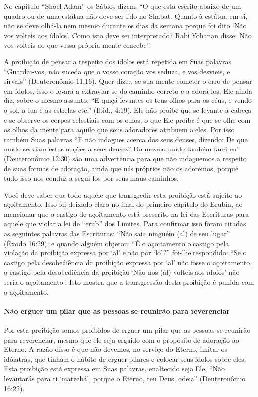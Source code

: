 No capítulo ``Shoel Adam'' os Sábios dizem: ``O que está escrito abaixo
de um quadro ou de uma estátua não deve ser lido no Shabat. Quanto à
estátua em si, não se deve olhá-la nem mesmo durante os dias da semana
porque foi dito `Não vos volteis aos ídolos'. Como isto deve ser
interpretado? Rabi Yohanan disse: Não vos volteis ao que vossa própria
mente concebe''.

A proibição de pensar a respeito dos ídolos está repetida em Suas
palavras ``Guardai-vos, não suceda que o vosso coração vos seduza, e vos
desvieis, e sirvais'' (Deuteronômio 11:16). Quer dizer, se sua mente
cometer o erro de pensar em ídolos, isso o levará a extraviar-se do
caminho correto e a adorá-los. Ele ainda diz, sobre o mesmo assunto, ``E
quiçá levantes os teus olhos para os céus, e vendo o sol, a lua e as
estrelas etc.'' (Ibid., 4:19). Ele não proíbe que se levante a cabeça e
se observe os corpos celestiais com os olhos; o que Ele proíbe é que se
olhe com os olhos da mente para aquilo que seus adoradores atribuem a
eles. Por isso também Suas palavras ``E não indagues acerca dos seus
deuses, dizendo: De que modo serviam estas nações a seus deuses? Do
mesmo modo também farei eu'' (Deuteronômio 12:30) são uma advertência
para que não indaguemos a respeito de suas formas de adoração, ainda que
nós próprios não os adoremos, porque tudo isso nos conduz a segui-los
por seus maus caminhos.

Você deve saber que todo aquele que transgredir esta proibição está
sujeito ao açoitamento. Isso foi deixado claro no final do primeiro
capítulo do Erubin, ao mencionar que o castigo de açoitamento está
prescrito na lei das Escrituras para aquele que violar a lei de ``erub''
dos Limites. Para confirmar isso foram citadas as seguintes palavras das
Escrituras: ``Não saia ninguém (al) de seu lugar'' (Êxodo 16:29); e
quando alguém objetou: ``É o açoitamento o castigo pela violação da
proibição expressa por `al' e não por `lo'?'' foi-lhe respondido: ``Se o
castigo pela desobediência da proibição expressa por `al' não fosse o
açoitamento, o castigo pela desobediência da proibição `Não nos (al)
volteis aos ídolos' não seria o açoitamento''. Isto mostra que a
transgressão desta proibição é punida com o açoitamento.

\paragraph{Não erguer um pilar que as pessoas se reunirão para reverenciar}

Por esta proibição somos proibidos de erguer um pilar que as pessoas se
reunirão para reverenciar, mesmo que ele seja erguido com o propósito de
adoração ao Eterno. A razão disso é que não devemos, no serviço do
Eterno, imitar os idólatras, que tinham o hábito de erguer pilares e
colocar seus ídolos sobre eles. Esta proibição está expressa em Suas
palavras, enaltecido seja Ele, ``Não levantarás para ti `matzebá',
porque o Eterno, teu Deus, odeia'' (Deuteronômio 16:22).

